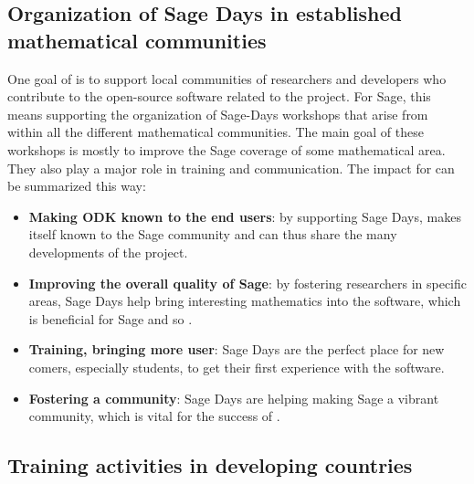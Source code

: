 \documentclass{deliverablereport}
\begin{document}


\subsection{Organization of Sage Days in established mathematical communities}

One goal of \ODK is to support local communities of researchers
and developers who contribute to the open-source software related to
the project. For Sage, this means supporting the organization of Sage-Days
workshops that arise from within all the different mathematical communities. The main 
goal of these workshops is mostly to improve the Sage coverage of some mathematical
area. They also play a major role in training and communication. The
impact for \ODK can be summarized this way:

\begin{itemize}
\item \textbf{Making ODK known to the end users}: by supporting Sage Days,
\ODK makes itself known to the Sage community and can
thus share the many developments of the project.

\item \textbf{Improving the overall quality of Sage}: by fostering researchers
in specific areas, Sage Days help bring interesting mathematics into
the software, which is beneficial for Sage and so \ODK.

\item \textbf{Training, bringing more user}: Sage Days are the perfect place
for new comers, especially students, to get their first experience with the software.

\item \textbf{Fostering a community}: Sage Days are helping making Sage a vibrant
community, which is vital for the success of \ODK.
\end{itemize}
















\subsection{Training activities in developing countries}
\end{document}

